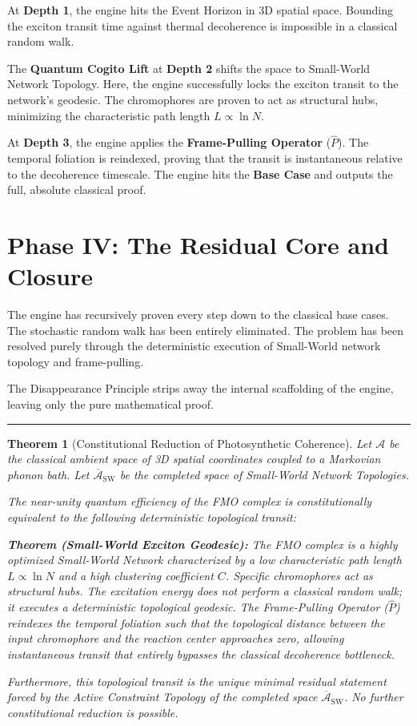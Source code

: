 \documentclass[11pt,openany]{extbook}
\theoremstyle{plain}
\newtheorem{theorem}{Theorem}[chapter]
\theoremstyle{definition}
\begin{document}
At \textbf{Depth 1}, the engine hits the Event Horizon in 3D spatial space. Bounding the exciton transit time against thermal decoherence is impossible in a classical random walk.

The \textbf{Quantum Cogito Lift} at \textbf{Depth 2} shifts the space to Small-World Network Topology. Here, the engine successfully locks the exciton transit to the network's geodesic. The chromophores are proven to act as structural hubs, minimizing the characteristic path length $L \propto \ln N$.

At \textbf{Depth 3}, the engine applies the \textbf{Frame-Pulling Operator} ($\hat{P}$). The temporal foliation is reindexed, proving that the transit is instantaneous relative to the decoherence timescale. The engine hits the \textbf{Base Case} and outputs the full, absolute classical proof.

\section{Phase IV: The Residual Core and Closure}

The engine has recursively proven every step down to the classical base cases. The stochastic random walk has been entirely eliminated. The problem has been resolved purely through the deterministic execution of Small-World network topology and frame-pulling.

The Disappearance Principle strips away the internal scaffolding of the engine, leaving only the pure mathematical proof.

\begin{center}
\rule{0.8\textwidth}{0.4pt}
\end{center}

\begin{theorem}[Constitutional Reduction of Photosynthetic Coherence]
Let $\mathcal{A}$ be the classical ambient space of 3D spatial coordinates coupled to a Markovian phonon bath. Let $\overline{\mathcal{A}}_{\text{SW}}$ be the completed space of Small-World Network Topologies.

The near-unity quantum efficiency of the FMO complex is constitutionally equivalent to the following deterministic topological transit:

\textbf{Theorem (Small-World Exciton Geodesic):} \textit{The FMO complex is a highly optimized Small-World Network characterized by a low characteristic path length $L \propto \ln N$ and a high clustering coefficient $C$. Specific chromophores act as structural hubs. The excitation energy does not perform a classical random walk; it executes a deterministic topological geodesic. The Frame-Pulling Operator ($\hat{P}$) reindexes the temporal foliation such that the topological distance between the input chromophore and the reaction center approaches zero, allowing instantaneous transit that entirely bypasses the classical decoherence bottleneck.}

Furthermore, this topological transit is the unique minimal residual statement forced by the Active Constraint Topology of the completed space $\overline{\mathcal{A}}_{\text{SW}}$. No further constitutional reduction is possible.
\end{theorem}
\end{document}
